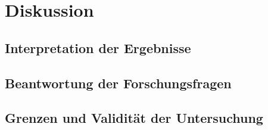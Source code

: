\chapter{Diskussion}\label{ch:diskussion}


\section{Interpretation der Ergebnisse}


\section{Beantwortung der Forschungsfragen}


\section{Grenzen und Validität der Untersuchung}
